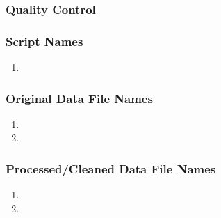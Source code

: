 \subsubsection*{Quality Control}

\subsubsection*{Script Names}

\begin{enumerate}
\item 
\end{enumerate}

\subsubsection*{Original Data File Names}

\begin{enumerate}
\item 
\item 
\end{enumerate}

\subsubsection*{Processed/Cleaned Data File Names}

\begin{enumerate}
\item 
\item 
\end{enumerate}
